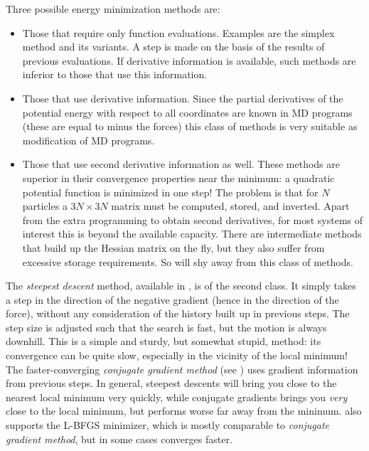 Three possible energy minimization methods are:
\begin{itemize}
\item   Those that require only function evaluations. Examples are the 
        simplex method and its variants. A step is made on the basis of the 
        results of previous evaluations. If derivative information is 
        available, such methods are inferior to those that use 
        this information.
\item   Those that use derivative information. Since the partial 
        derivatives of the potential energy with respect to all 
        coordinates are known in MD programs (these are equal to minus 
        the forces) this class of methods is very suitable as modification 
        of MD programs.
\item   Those that use second derivative information as well. These methods 
        are superior in their convergence properties near the minimum: a 
        quadratic potential function is minimized in one step! The problem 
        is that for $N$ particles a $3N\times 3N$ matrix must be computed, 
        stored, and inverted. Apart from the extra programming to obtain 
        second derivatives, for most systems of interest this is beyond the 
        available capacity. There are intermediate methods that build up the 
        Hessian matrix on the fly, but they also suffer from excessive 
        storage requirements. So {\gromacs} will shy away from this class 
        of methods.
\end{itemize}


The {\em steepest descent} method, available in {\gromacs}, is of the
second class. It simply takes a step in the direction of the negative
gradient (hence in the direction of the force), without any
consideration of the history built up in previous steps. The step size
is adjusted such that the search is fast, but the motion is always
downhill. This is a simple and sturdy, but somewhat stupid, method:
its convergence can be quite slow, especially in the vicinity of the
local minimum! The faster-converging {\em conjugate gradient method}
(see {\eg} \cite{Zimmerman91}) uses gradient information from previous
steps. In general, steepest descents will bring you close to the
nearest local minimum very quickly, while conjugate gradients brings
you {\em very} close to the local minimum, but performs worse far away
from the minimum. {\gromacs} also supports the L-BFGS minimizer, which
is mostly comparable to {\em conjugate gradient method}, but in some 
cases converges faster.

